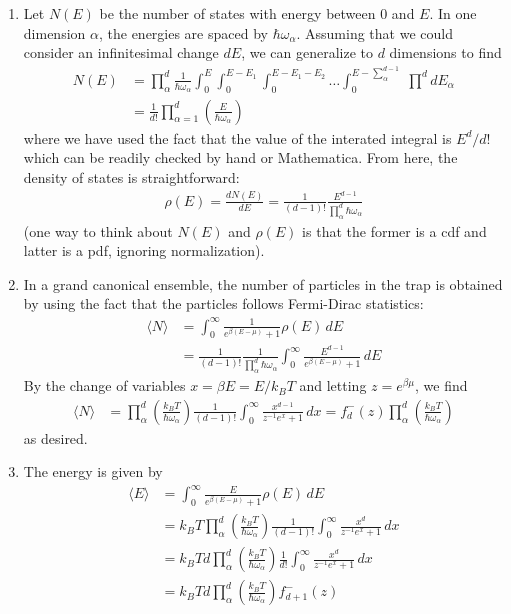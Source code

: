 \documentclass{article}
\theoremstyle{definition}
\newcommand{\al}{\alpha}
\newcommand{\be}{\beta}
\newcommand{\f}[2]{\frac{#1}{#2}}
\newcommand{\lp}{\left(}
\newcommand{\rp}{\right)}
\begin{document}
\begin{enumerate}[label=(\alph*)]
	\item Let $N(E)$ be the number of states with energy between 0 and $E$. In one dimension $\al$, the energies are spaced by $\hbar \omega_\al$. Assuming that we could consider an infinitesimal change $dE$, we can generalize to $d$ dimensions to find 
	\begin{align*}
	N(E) 
	&= \prod^d_\al \f{1}{\hbar \omega_\al}\int_0^E \int_0^{E-E_1}\int_0^{E-E_1-E_2} \dots \int _0^{E - \sum_\al^{d-1}}\,\prod^d dE_\al \\
	&= \boxed{\f{1}{d!}\prod_{\al=1}^d\lp \f{E}{\hbar \omega_\al} \rp}
	\end{align*}
	where we have used the fact that the value of the interated integral is $E^d/d!$ which can be readily checked by hand or Mathematica. From here, the density of states is straightforward:
	\begin{align*}
	\rho(E) = \f{dN(E)}{dE} = \boxed{\f{1}{(d-1)!} \f{E^{d-1}}{\prod_\al^d \hbar \omega_\al} }
	\end{align*}
	(one way to think about $N(E)$ and $\rho(E)$ is that the former is a cdf and latter is a pdf, ignoring normalization).
	
	
	
	
	\item In a grand canonical ensemble, the number of particles in the trap is obtained by using the fact that the particles follows Fermi-Dirac statistics: 
	\begin{align*}
	\langle N \rangle 
	&= \int_0^\infty \f{1}{e^{\be(E-\mu)} + 1} \rho(E)\,dE \\
	&= \f{1}{(d-1)!} \f{1}{\prod_\al^d \hbar \omega_\al} \int_0^\infty \f{E^{d-1}}{e^{\be(E-\mu)} + 1} \,dE
	\end{align*}
	By the change of variables $x = \be E = E/k_BT$ and letting $z = e^{\be \mu}$, we find 
	\begin{align*}
	\langle N \rangle 
	&= \prod_\al^d \lp \f{k_BT}{\hbar \omega_\al}\rp \f{1}{(d-1)!}\int_0^\infty \f{x^{d-1}}{z^{-1}e^x +1 }\,dx = 
	\boxed{f^-_d(z) \prod_\al^d \lp \f{k_BT}{\hbar \omega_\al} \rp}
	\end{align*}
	as desired. 
	
	
	
	
	\item The energy is given by 
	\begin{align*}
	\langle E \rangle 
	&= \int_0^\infty  \f{E}{e^{\be(E-\mu)} + 1} \rho(E)\,dE \\
	&= k_B T\prod_\al^d \lp \f{k_BT}{\hbar \omega_\al}\rp \f{1}{(d-1)!}\int_0^\infty \f{x^{d}}{z^{-1}e^x +1 }\,dx\\
	&= k_B T d  \prod_\al^d \lp \f{k_BT}{\hbar \omega_\al}\rp \f{1}{d!}\int_0^\infty \f{x^{d}}{z^{-1}e^x +1 }\,dx\\
	&= \boxed{k_B T d  \prod_\al^d \lp \f{k_BT}{\hbar \omega_\al}\rp f^-_{d+1}(z)}
	\end{align*}
	

\end{enumerate}
\end{document}
